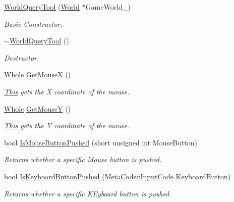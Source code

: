 \begin{DoxyCompactItemize}
\item 
\hyperlink{classphys_1_1WorldQueryTool_a6b156ab7ea6236402c40467da7f11c0d}{WorldQueryTool} (\hyperlink{classphys_1_1World}{World} $\ast$GameWorld\_\-)
\begin{DoxyCompactList}\small\item\em Basic Constructor. \item\end{DoxyCompactList}\item 
\hyperlink{classphys_1_1WorldQueryTool_ace36ffebcabbbf0553c517820bc636c9}{$\sim$WorldQueryTool} ()
\begin{DoxyCompactList}\small\item\em Destructor. \item\end{DoxyCompactList}\item 
\hyperlink{namespacephys_a460f6bc24c8dd347b05e0366ae34f34a}{Whole} \hyperlink{classphys_1_1WorldQueryTool_a55721f152fb117fdfb8bc6d20af6b1dc}{GetMouseX} ()
\begin{DoxyCompactList}\small\item\em \hyperlink{structThis}{This} gets the X coordinate of the mouse. \item\end{DoxyCompactList}\item 
\hyperlink{namespacephys_a460f6bc24c8dd347b05e0366ae34f34a}{Whole} \hyperlink{classphys_1_1WorldQueryTool_ac2d8517db7305157c1393320f434751b}{GetMouseY} ()
\begin{DoxyCompactList}\small\item\em \hyperlink{structThis}{This} gets the Y coordinate of the mouse. \item\end{DoxyCompactList}\item 
bool \hyperlink{classphys_1_1WorldQueryTool_af277b578432dfaefffbc4fd9bb80ca64}{IsMouseButtonPushed} (short unsigned int MouseButton)
\begin{DoxyCompactList}\small\item\em Returns whether a specific Mouse button is pushed. \item\end{DoxyCompactList}\item 
bool \hyperlink{classphys_1_1WorldQueryTool_a8343f54b900adb316ddc6de5405da328}{IsKeyboardButtonPushed} (\hyperlink{classphys_1_1MetaCode_a3e501cbb5bf0f6f1fdb7211465bda8d8}{MetaCode::InputCode} KeyboardButton)
\begin{DoxyCompactList}\small\item\em Returns whether a specific KEyboard button is pushed. \item\end{DoxyCompactList}\item 

\end{DoxyCompactItemize}
